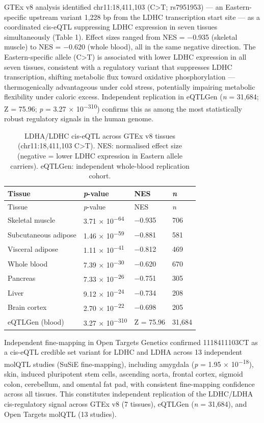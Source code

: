 \documentclass[
  letterpaper,
  DIV=11,
  numbers=noendperiod]{scrartcl}
\begin{document}
GTEx v8 analysis identified chr11:18,411,103 (C\textgreater T;
rs7951953) --- an Eastern-specific upstream variant 1,228 bp from the
LDHC transcription start site --- as a coordinated cis-eQTL
suppressing LDHC expression in seven tissues simultaneously (Table 1).
Effect sizes ranged from NES = −0.935 (skeletal muscle) to NES = −0.620
(whole blood), all in the same negative direction. The Eastern-specific
allele (C\textgreater T) is associated with lower LDHC expression in all
seven tissues, consistent with a regulatory variant that suppresses LDHC
transcription, shifting metabolic flux toward oxidative phosphorylation
--- thermogenically advantageous under cold stress, potentially
impairing metabolic flexibility under caloric excess. Independent
replication in eQTLGen (\emph{n} = 31,684; Z = 75.96; \emph{p} = 3.27 ×
10\textsuperscript{−310}) confirms this as among the most statistically
robust regulatory signals in the human genome.

\begin{longtable}[]{@{}llll@{}}
\caption{LDHA/LDHC cis-eQTL across GTEx v8 tissues (chr11:18,411,103
C\textgreater T). NES: normalised effect size (negative = lower LDHC
expression in Eastern allele carriers). eQTLGen: independent whole-blood
replication cohort.}\label{tbl-eqtl}\tabularnewline
\toprule\noalign{}
Tissue & \emph{p}-value & NES & \emph{n} \\
\midrule\noalign{}
\endfirsthead
\toprule\noalign{}
Tissue & \emph{p}-value & NES & \emph{n} \\
\midrule\noalign{}
\endhead
\bottomrule\noalign{}
\endlastfoot
Skeletal muscle & 3.71 × 10\textsuperscript{−64} & −0.935 & 706 \\
Subcutaneous adipose & 1.46 × 10\textsuperscript{−59} & −0.881 & 581 \\
Visceral adipose & 1.11 × 10\textsuperscript{−41} & −0.812 & 469 \\
Whole blood & 7.39 × 10\textsuperscript{−30} & −0.620 & 670 \\
Pancreas & 7.33 × 10\textsuperscript{−26} & −0.751 & 305 \\
Liver & 9.12 × 10\textsuperscript{−24} & −0.734 & 208 \\
Brain cortex & 2.70 × 10\textsuperscript{−22} & −0.698 & 205 \\
eQTLGen (blood) & 3.27 × 10\textsuperscript{−310} & Z = 75.96 &
31,684 \\
\end{longtable}

Independent fine-mapping in Open Targets Genetics confirmed 11\textunderscore{}18411103\textunderscore{}C\textunderscore{}T as a cis-eQTL credible set variant for LDHC and LDHA across 13 independent molQTL studies (SuSiE fine-mapping), including amygdala (\textit{p} = 1.95 × 10\textsuperscript{−18}), skin, induced pluripotent stem cells, ascending aorta, frontal cortex, sigmoid colon, cerebellum, and omental fat pad, with consistent fine-mapping confidence across all tissues. This constitutes independent replication of the LDHC/LDHA cis-regulatory signal across GTEx v8 (7 tissues), eQTLGen (\textit{n} = 31,684), and Open Targets molQTL (13 studies).
\end{document}
